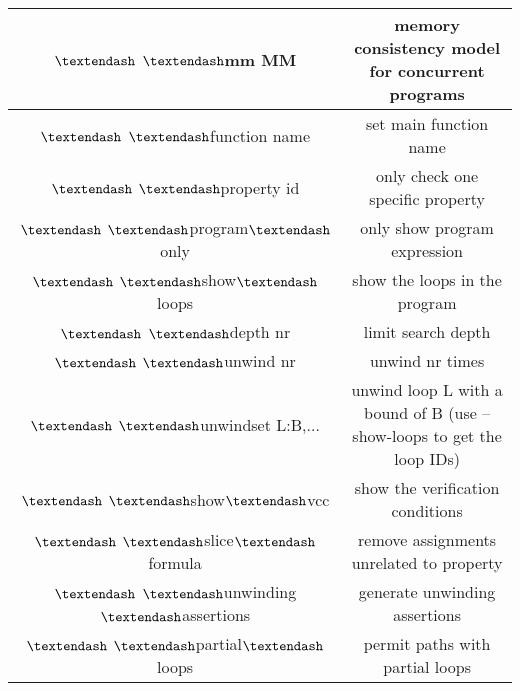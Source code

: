 \begin{center}
\begin{tabular}{|| c | c ||}
\hline
$\textendash$ $\textendash$mm MM                   &   memory consistency model for concurrent programs \\
\hline
$\textendash$ $\textendash$function name         &     set main function name \\
\hline
$\textendash$ $\textendash$property id           &     only check one specific property \\
\hline
$\textendash$ $\textendash$program$\textendash$only          &     only show program expression \\
\hline
$\textendash$ $\textendash$show$\textendash$loops            &     show the loops in the program \\
\hline
$\textendash$ $\textendash$depth nr              &     limit search depth \\
\hline
$\textendash$ $\textendash$unwind nr             &     unwind nr times \\
\hline
$\textendash$ $\textendash$unwindset L:B,...     &     unwind loop L with a bound of B
                                                       (use --show-loops to get the loop IDs) \\
\hline                        
$\textendash$ $\textendash$show$\textendash$vcc               &    show the verification conditions \\
\hline
$\textendash$ $\textendash$slice$\textendash$formula         &     remove assignments unrelated to property \\
\hline
$\textendash$ $\textendash$unwinding$\textendash$assertions   &    generate unwinding assertions \\
\hline
$\textendash$ $\textendash$partial$\textendash$loops          &    permit paths with partial loops \\

\hline

\end{tabular}

\end{center}
 